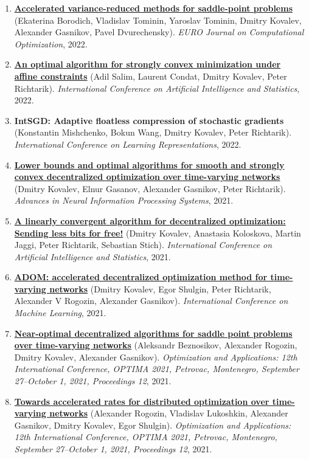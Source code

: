 \begin{enumerate}
\item
\textbf{\href{http://crm-en.ics.org.ru/uploads/crmissues/crm_2023_02/22_tominin.pdf}{Accelerated variance-reduced methods for saddle-point problems}} (Ekaterina Borodich, Vladislav Tominin, Yaroslav Tominin, Dmitry Kovalev, Alexander Gasnikov, Pavel Dvurechensky). \textit{EURO Journal on Computational Optimization}, 2022.
\item
\textbf{\href{https://proceedings.mlr.press/v151/salim22a.html}{An optimal algorithm for strongly convex minimization under affine constraints}} (Adil Salim, Laurent Condat, Dmitry Kovalev, Peter Richtarik). \textit{International Conference on Artificial Intelligence and Statistics}, 2022.
\item
\textbf{IntSGD: Adaptive floatless compression of stochastic gradients} (Konstantin Mishchenko, Bokun Wang, Dmitry Kovalev, Peter Richtarik). \textit{International Conference on Learning Representations}, 2022.
\item
\textbf{\href{https://proceedings.neurips.cc/paper/2021/hash/bc37e109d92bdc1ea71da6c919d54907-Abstract.html}{Lower bounds and optimal algorithms for smooth and strongly convex decentralized optimization over time-varying networks}} (Dmitry Kovalev, Elnur Gasanov, Alexander Gasnikov, Peter Richtarik). \textit{Advances in Neural Information Processing Systems}, 2021.
\item
\textbf{\href{https://proceedings.mlr.press/v130/kovalev21a.html}{A linearly convergent algorithm for decentralized optimization: Sending less bits for free!}} (Dmitry Kovalev, Anastasia Koloskova, Martin Jaggi, Peter Richtarik, Sebastian Stich). \textit{International Conference on Artificial Intelligence and Statistics}, 2021.
\item
\textbf{\href{http://proceedings.mlr.press/v139/kovalev21a}{ADOM: accelerated decentralized optimization method for time-varying networks}} (Dmitry Kovalev, Egor Shulgin, Peter Richtarik, Alexander V Rogozin, Alexander Gasnikov). \textit{International Conference on Machine Learning}, 2021.
\item
\textbf{\href{https://link.springer.com/chapter/10.1007/978-3-030-91059-4_18}{Near-optimal decentralized algorithms for saddle point problems over time-varying networks}} (Aleksandr Beznosikov, Alexander Rogozin, Dmitry Kovalev, Alexander Gasnikov). \textit{Optimization and Applications: 12th International Conference, OPTIMA 2021, Petrovac, Montenegro, September 27–October 1, 2021, Proceedings 12}, 2021.
\item
\textbf{\href{https://link.springer.com/chapter/10.1007/978-3-030-91059-4_19}{Towards accelerated rates for distributed optimization over time-varying networks}} (Alexander Rogozin, Vladislav Lukoshkin, Alexander Gasnikov, Dmitry Kovalev, Egor Shulgin). \textit{Optimization and Applications: 12th International Conference, OPTIMA 2021, Petrovac, Montenegro, September 27–October 1, 2021, Proceedings 12}, 2021.

\end{enumerate}
